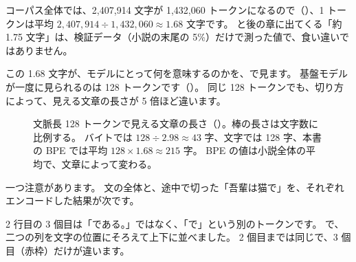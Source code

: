 コーパス全体では、2,407,914 文字が 1,432,060 トークンになるので（）、1 トークンは平均 $2{,}407{,}914\div1{,}432{,}060\approx1.68$ 文字です。
と後の章に出てくる「約 1.75 文字」は、検証データ（小説の末尾の 5\%）だけで測った値で、食い違いではありません。

この 1.68 文字が、モデルにとって何を意味するのかを、で見ます。
基盤モデルが一度に見られるのは 128 トークンです（）。
同じ 128 トークンでも、切り方によって、見える文章の長さが 5 倍ほど違います。

\begin{figure}[tbp]
\centering
{}
\caption{文脈長 128 トークンで見える文章の長さ（）。棒の長さは文字数に比例する。
バイトでは $128\div2.98\approx43$ 字、文字では 128 字、本書の BPE では平均 $128\times1.68\approx215$ 字。
BPE の値は小説全体の平均で、文章によって変わる。}
\label{fig:tok-window}
\end{figure}

一つ注意があります。
文の全体と、途中で切った「吾輩は猫で」を、それぞれエンコードした結果が次です。


2 行目の 3 個目は「である。」ではなく、「で」という別のトークンです。
で、二つの列を文字の位置にそろえて上下に並べました。
2 個目までは同じで、3 個目（赤枠）だけが違います。

